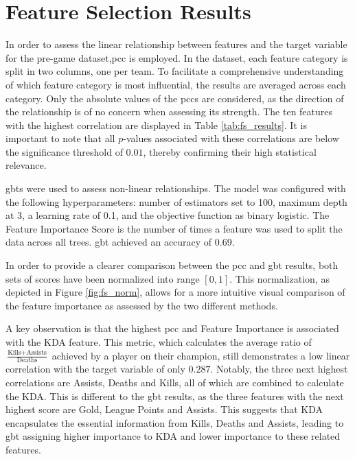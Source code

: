 \documentclass[12pt, a4paper, headinclude, twoside, plainheadsepline, open=right, numbers=noenddot, hidelinks, toc=listof, toc=bibliography]{scrreprt}
\begin{document}
\section{Feature Selection Results}
\label{sec:feature_selection_results}

In order to assess the linear relationship between features and the target variable for the pre-game dataset,\acl{pcc} is employed.
In the dataset, each feature category is split in two columns, one per team.
To facilitate a comprehensive understanding of which feature category is most influential, the results are averaged across each category.
Only the absolute values of the \acp{pcc} are considered, as the direction of the relationship is of no concern when assessing its strength.
The ten features with the highest correlation are displayed in Table \ref{tab:fs_results}.
It is important to note that all $p$-values associated with these correlations are below the significance threshold of $0.01$, thereby confirming their high statistical relevance.

\Aclp{gbt} were used to assess non-linear relationships.
The model was configured with the following hyperparameters: number of estimators set to 100, maximum depth at 3, a learning rate of 0.1, and the objective function as binary logistic.
The Feature Importance Score is the number of times a feature was used to split the data across all trees.
\Ac{gbt} achieved an accuracy of 0.69.

In order to provide a clearer comparison between the \ac{pcc} and \ac{gbt} results, both sets of scores have been normalized into range $[0, 1]$.
This normalization, as depicted in Figure \ref{fig:fs_norm}, allows for a more intuitive visual comparison of the feature importance as assessed by the two different methods.

A key observation is that the highest \ac{pcc} and Feature Importance is associated with the KDA feature. 
This metric, which calculates the average ratio of $\frac{\text{Kills} + \text{Assists}}{\text{Deaths}}$ achieved by a player on their champion, still demonstrates a low linear correlation with the target variable of only $0.287$.
Notably, the three next highest correlations are Assists, Deaths and Kills, all of which are combined to calculate the KDA.
This is different to the \ac{gbt} results, as the three features with the next highest score are Gold, League Points and Assists.
This suggests that KDA encapsulates the essential information from Kills, Deaths and Assists, leading to \ac{gbt} assigning higher importance to KDA and lower importance to these related features.
\end{document}
